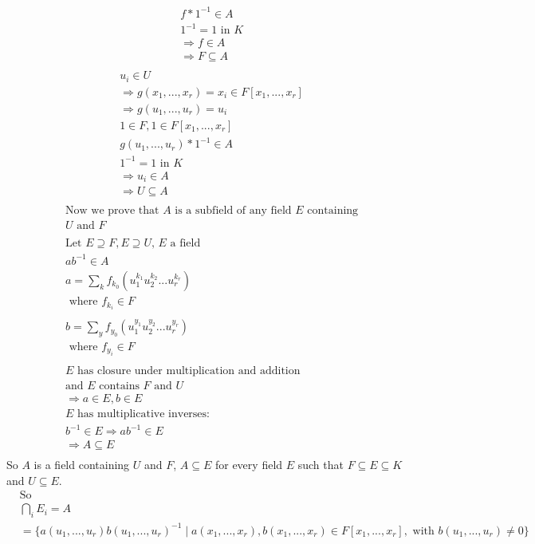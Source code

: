 \documentclass[11pt]{article}
\begin{document}
{\begin{align*}
&f*1^{-1} \in A\\
&1^{-1} = 1\text{ in $K$}\\
& \Rightarrow f \in A\\
&\Rightarrow F \subseteq A\\
\end{align*}
\begin{align*}
&u_i \in U\\
&\Rightarrow g(x_1, ..., x_r) = x_i \in F[x_1, ..., x_r]\\
&\Rightarrow g(u_1, ..., u_r) = u_i \\
&1 \in F, 1 \in F[x_1, ..., x_r]\\
&g(u_1, ..., u_r)*1^{-1} \in A\\
&1^{-1} = 1\text{ in $K$}\\
&\Rightarrow u_i \in A\\
&\Rightarrow U \subseteq A\\
\end{align*}
\begin{align*}
&\text{Now we prove that $A$ is a subfield of any field $E$ containing}\\
&\text{$U$ and $F$}\\
&\\
&\text{Let $E \supseteq F, E \supseteq U$, $E$ a field}\\
&ab^{-1} \in A\\
&a = \sum_k f_{k_0}(u_1^{k_1}u_2^{k_2}...u_r^{k_r})\\
&\text{ where $f_{k_i} \in F$}\\
&\\
&b = \sum_y f_{y_0}(u_1^{y_1}u_2^{y_2}...u_r^{y_r})\\
&\text{ where $f_{y_i} \in F$}\\
&\\
&\text{$E$ has closure under multiplication and addition}\\
&\text{and $E$ contains $F$ and $U$}\\
&\Rightarrow a \in E, b \in E\\
&\text{$E$ has multiplicative inverses}:\\
&b^{-1} \in E \Rightarrow ab^{-1} \in E\\
&\Rightarrow A \subseteq E\\
\end{align*}
So $A$ is a field containing $U$ and $F$, $A \subseteq E$ for every field $E$ such that $F \subseteq E \subseteq K$ and $U \subseteq E$. 
\begin{align*}
&\text{So}\\
&\bigcap_i E_i = A\\
& = \{a(u_1, ..., u_r)b(u_1, ..., u_r)^{-1} \mid a(x_1, ..., x_r), b(x_1, ..., x_r) \in F[x_1, ..., x_r], \text{ with } b(u_1, ..., u_r) \neq 0\}
\end{align*}
}
\end{document}
